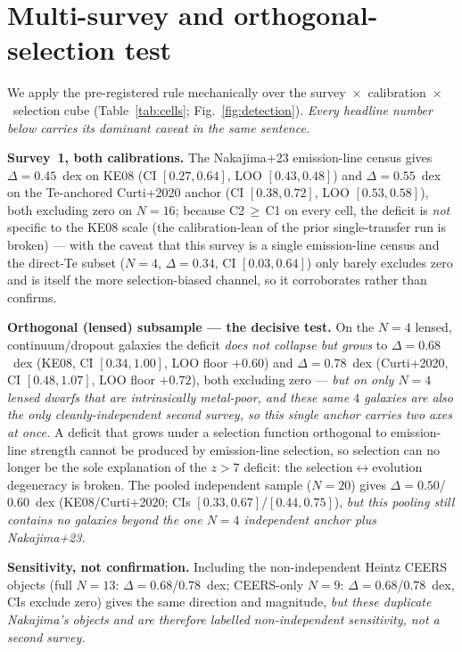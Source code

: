 \documentclass[twocolumn]{aastex631}
\begin{document}
\section{Multi-survey and orthogonal-selection test}\label{sec:test}
We apply the pre-registered rule mechanically over the survey~$\times$~calibration~$\times$~selection cube (Table~\ref{tab:cells}; Fig.~\ref{fig:detection}). \emph{Every headline number below carries its dominant caveat in the same sentence.}

\textbf{Survey~1, both calibrations.} The Nakajima+23 emission-line census gives $\Delta=0.45$~dex on KE08 (CI $[0.27,0.64]$, LOO $[0.43,0.48]$) and $\Delta=0.55$~dex on the Te-anchored Curti+2020 anchor (CI $[0.38,0.72]$, LOO $[0.53,0.58]$), both excluding zero on $N=16$; because C2$\,\geq\,$C1 on every cell, the deficit is \emph{not} specific to the KE08 scale (the calibration-lean of the prior single-transfer run is broken) --- with the caveat that this survey is a single emission-line census and the direct-Te subset ($N=4$, $\Delta=0.34$, CI $[0.03,0.64]$) only barely excludes zero and is itself the more selection-biased channel, so it corroborates rather than confirms.

\textbf{Orthogonal (lensed) subsample --- the decisive test.} On the $N=4$ lensed, continuum/dropout galaxies the deficit \emph{does not collapse but grows} to $\Delta=0.68$~dex (KE08, CI $[0.34,1.00]$, LOO floor $+0.60$) and $\Delta=0.78$~dex (Curti+2020, CI $[0.48,1.07]$, LOO floor $+0.72$), both excluding zero --- \emph{but on only $N=4$ lensed dwarfs that are intrinsically metal-poor, and these same $4$ galaxies are also the only cleanly-independent second survey, so this single anchor carries two axes at once.} A deficit that grows under a selection function orthogonal to emission-line strength cannot be produced by emission-line selection, so selection can no longer be the sole explanation of the $z>7$ deficit: the selection$\leftrightarrow$evolution degeneracy is broken. The pooled independent sample ($N=20$) gives $\Delta=0.50$/$0.60$~dex (KE08/Curti+2020; CIs $[0.33,0.67]$/$[0.44,0.75]$), \emph{but this pooling still contains no galaxies beyond the one $N=4$ independent anchor plus Nakajima+23.}

\textbf{Sensitivity, not confirmation.} Including the non-independent Heintz CEERS objects (full $N=13$: $\Delta=0.68$/$0.78$~dex; CEERS-only $N=9$: $\Delta=0.68$/$0.78$~dex, CIs exclude zero) gives the same direction and magnitude, \emph{but these duplicate Nakajima's objects and are therefore labelled non-independent sensitivity, not a second survey.}
\end{document}
